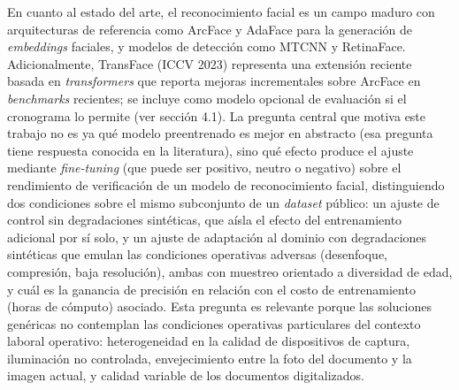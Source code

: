 \documentclass[
  11pt, %
]{charter}
\begin{document}
En cuanto al estado del arte, el reconocimiento facial es un campo maduro con arquitecturas de referencia como ArcFace y AdaFace para la generación de \textit{embeddings} faciales, y modelos de detección como MTCNN y RetinaFace. Adicionalmente, TransFace (ICCV 2023) representa una extensión reciente basada en \textit{transformers} que reporta mejoras incrementales sobre ArcFace en \textit{benchmarks} recientes; se incluye como modelo opcional de evaluación si el cronograma lo permite (ver sección 4.1). La pregunta central que motiva este trabajo no es ya qué modelo preentrenado es mejor en abstracto (esa pregunta tiene respuesta conocida en la literatura), sino qué efecto produce el ajuste mediante \textit{fine-tuning} (que puede ser positivo, neutro o negativo) sobre el rendimiento de verificación de un modelo de reconocimiento facial, distinguiendo dos condiciones sobre el mismo subconjunto de un \textit{dataset} público: un ajuste de control sin degradaciones sintéticas, que aísla el efecto del entrenamiento adicional por sí solo, y un ajuste de adaptación al dominio con degradaciones sintéticas que emulan las condiciones operativas adversas (desenfoque, compresión, baja resolución), ambas con muestreo orientado a diversidad de edad, y cuál es la ganancia de precisión en relación con el costo de entrenamiento (horas de cómputo) asociado. Esta pregunta es relevante porque las soluciones genéricas no contemplan las condiciones operativas particulares del contexto laboral operativo: heterogeneidad en la calidad de dispositivos de captura, iluminación no controlada, envejecimiento entre la foto del documento y la imagen actual, y calidad variable de los documentos digitalizados.
\end{document}
